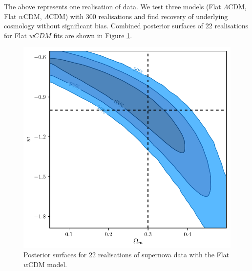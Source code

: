 \documentclass[a4paper,fleqn,usenatbib]{mnras}
\begin{document}
The above represents one realisation of data. We test three models (Flat $\Lambda$CDM, Flat $w$CDM, $\Lambda$CDM) with 300 realisations and find recovery of underlying cosmology without significant bias. Combined posterior surfaces of 22 realisations for Flat $wCDM$ fits are shown in Figure \ref{fig:simple_w}.


\begin{figure}
	\begin{center}
		\includegraphics[width=\columnwidth]{approximate_simple_test_w_cosmo.pdf}
	\end{center}
	\caption{Posterior surfaces for 22 realisations of supernova data with the Flat $w$CDM model.}
	\label{fig:simple_w}
\end{figure}
\end{document}
